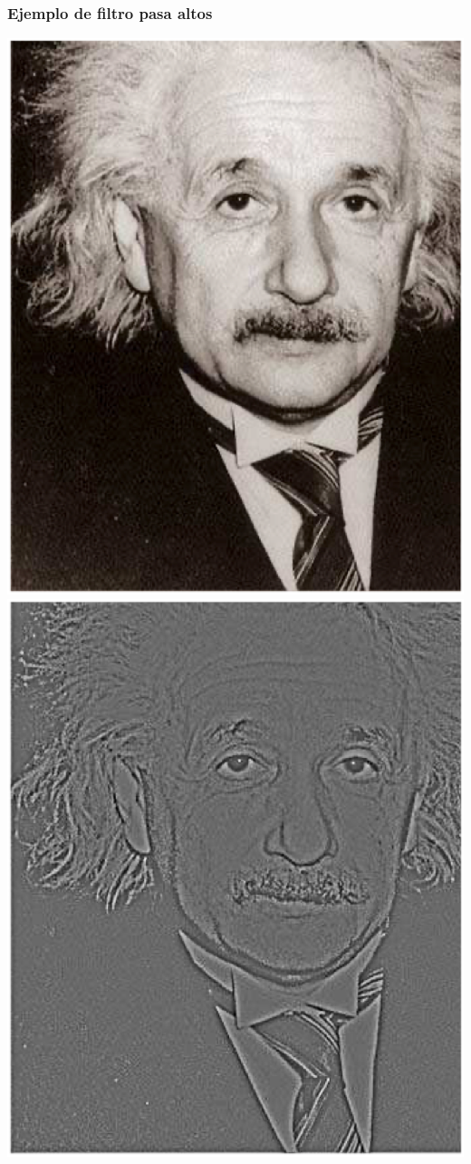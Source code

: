 \begin{frame}
\frametitle{Ejemplo de filtro pasa altos}
\centering
\includegraphics[scale=0.27]{Imagenes/Einstein_01.eps}
\pause
\includegraphics[scale=0.27]{Imagenes/Einstein_02.eps}
\end{frame}
